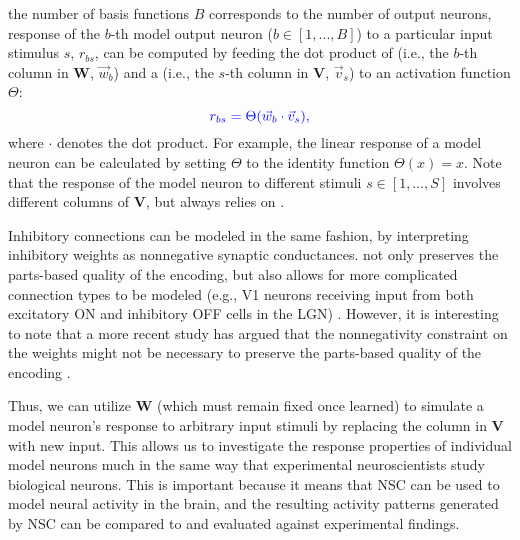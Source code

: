  the number of basis functions $B$ 
corresponds to the number of output neurons, 
response of the $b$-th model output neuron
($b \in [1, ..., B]$)
to a particular input stimulus $s$,  $r_{bs}$,
can be computed by feeding the dot product of
(i.e., the $b$-th column in $\mathbf{W}$, $\vec{w}_b$)
and a 
(i.e., the $s$-th column in \textbf{V}, $\vec{v}_s$)
to an activation function $\Theta$:
\begin{equation}
\textcolor{blue}{r_{bs} = \Theta(\vec{w}_b \cdot \vec{v}_s),}
\label{eqn:nsc-model-response}
\end{equation}
where $\cdot$ denotes the dot product.
For example, the linear response of a model neuron
can be calculated by setting $\Theta$ to the identity function $\Theta(x)=x$.
Note that the response of the model neuron to different stimuli 
$s \in [1, \ldots, S]$
involves different columns of \textbf{V},
but always relies on .

Inhibitory connections can be modeled in the same fashion,
by interpreting inhibitory  weights
as nonnegative synaptic conductances.
 not only preserves the parts-based quality of the encoding,
but also allows for more complicated connection types to be modeled
(e.g., \ac{V1} neurons receiving input from both excitatory ON
and inhibitory OFF cells in the \ac{LGN}) \cite{Hoyer2003}.
However, it is interesting to note that a more recent study has argued
that the nonnegativity constraint on the
 weights might not be necessary 
to preserve the parts-based quality of the encoding \cite{Liu2017}.


Thus, we can utilize \textbf{W} 
(which must remain fixed once learned)
to simulate a model neuron's response to arbitrary input stimuli
by replacing the column in \textbf{V} with new input.
This allows us to investigate the response properties 
of individual model neurons
much in the same way that experimental neuroscientists 
study biological neurons.
This is important because it means that \ac{NSC} can be used to 
model neural activity in the brain, 
and the resulting activity patterns generated by \ac{NSC}
can be compared to and evaluated against experimental findings. 

